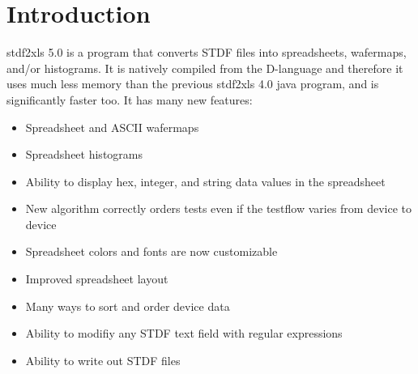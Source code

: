 \documentclass[letterpaper]{article}
\begin{document}
\selectfont
\newcommand{\tfont}{\usefont{T1}{ua1}{m}{n}\selectfont\footnotesize}
\newcommand{\bfont}{\usefont{T1}{ua1}{b}{n}\selectfont\tiny}
\newcommand{\xfont}{\usefont{T1}{ua1}{m}{n}\selectfont\scriptsize}
\newcommand{\lfont}{\usefont{T1}{ua1}{m}{n}\selectfont\large}
\renewcommand{\captionfont}{\it }
\renewcommand{\date}{February 26, 2020}
\newcommand{\ver}{V1.0}
\newcommand{\tablecap}{\hline\end{tabular}\end{table}\end{center}}
\renewcommand{\versionhistory}{
\vspace*{1in}
\begin{center}
\begin{table}[H]\caption*{Revision History}
\centering
\xfont\begin{tabular}[H]{|c|c|c|c|}
\hline
{\bf Version} & {\bf Author} & {\bf Date} & {\bf Changes}\\
\hline
\hline
1.0 & Eric West & 2/26/20 & Initial Release \\
\hline
\end{tabular}
\end{table}
\end{center}
}
\maketitle
\setcounter{tocdepth}{2}
\tableofcontents
\clearpage
\makebg

\section{Introduction}
stdf2xls 5.0 is a program that converts STDF files into spreadsheets, wafermaps, and/or histograms.
It is natively compiled from the D-language and therefore it uses much less memory than the previous
stdf2xls 4.0 java program, and is significantly faster too.  It has many new features:
\begin{itemize}
\item Spreadsheet and ASCII wafermaps
\item Spreadsheet histograms
\item Ability to display hex, integer, and string data values in the spreadsheet
\item New algorithm correctly orders tests even if the testflow varies from device to device
\item Spreadsheet colors and fonts are now customizable
\item Improved spreadsheet layout
\item Many ways to sort and order device data
\item Ability to modifiy any STDF text field with regular expressions
\item Ability to write out STDF files
\end{itemize}
\end{document}
